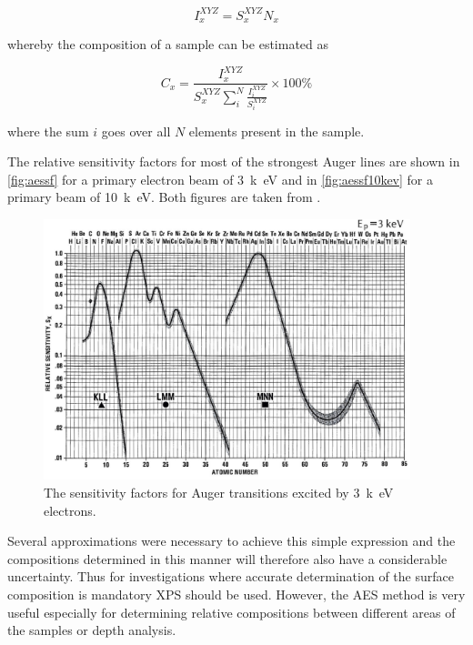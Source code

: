 \begin{equation}
I^{XYZ}_x=S_x^{XYZ}N_x
\end{equation}
          
\noindent whereby the composition of a sample can be estimated as

\begin{equation}
C_x=\frac{I^{XYZ}_x}{S_x^{XYZ}\sum_i^N\frac{I^{XYZ}_i}{S_i^{XYZ}}}\times 100\%
\end{equation}
            
\noindent where the sum $i$ goes over all $N$ elements present in the sample.

The relative sensitivity factors for most of the strongest Auger lines are shown in \autoref{fig:aessf} for a primary electron beam of \SI{3}{k\electronvolt} and in \autoref{fig:aessf10kev} for a primary beam of \SI{10}{k\electronvolt}. Both figures are taken from \cite{handbook}.

\begin{figure}[h!]
	\begin{center}
	\includegraphics[width=0.95\textwidth]{figures/auger_sensitivity_3kev.png}
	\caption{The sensitivity factors for Auger transitions excited by \SI{3}{k\electronvolt} electrons.}
	\label{fig:aessf}
	\end{center}
\end{figure}

Several approximations were necessary to achieve this simple expression and the compositions determined in this manner will therefore also have a considerable uncertainty. Thus for investigations where accurate determination of the surface composition is mandatory XPS should be used. However, the AES method is very useful especially for determining relative compositions between different areas of the samples or depth analysis.

